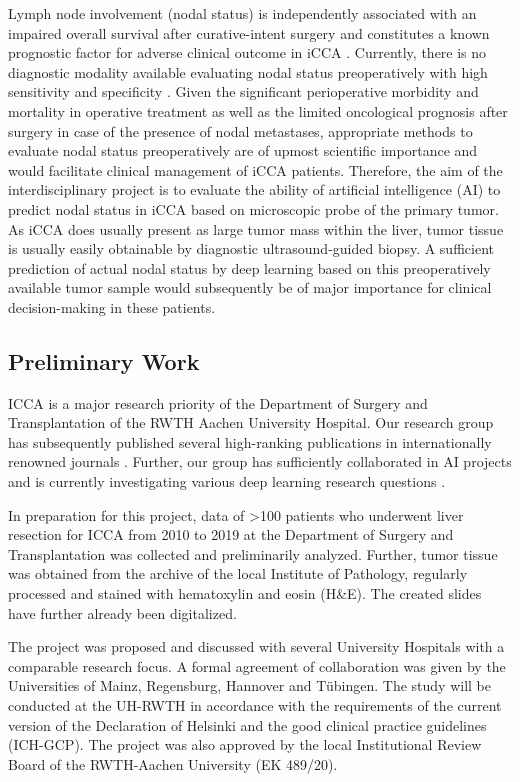 \documentclass[12pt]{article}
\begin{document}
Lymph node involvement (nodal status) is independently associated with an impaired overall survival after curative-intent surgery and constitutes a known prognostic factor for adverse clinical outcome in iCCA \cite{b2, b13}. Currently, there is no diagnostic modality available evaluating nodal status preoperatively with high sensitivity and specificity \cite{b14}. Given the significant perioperative morbidity and mortality in operative treatment as well as the limited oncological prognosis after surgery in case of the presence of nodal metastases, appropriate methods to evaluate nodal status preoperatively are of upmost scientific importance and would facilitate clinical management of iCCA patients. Therefore, the aim of the interdisciplinary project is to evaluate the ability of artificial intelligence (AI) to predict nodal status in iCCA based on microscopic probe of the primary tumor. As iCCA does usually present as large tumor mass within the liver, tumor tissue is usually easily obtainable by diagnostic ultrasound-guided biopsy. A sufficient prediction of actual nodal status by deep learning based on this preoperatively available tumor sample would subsequently be of major importance for clinical decision-making in these patients.

\subsection{Preliminary Work}
ICCA is a major research priority of the Department of Surgery and Transplantation of the RWTH Aachen University Hospital. Our research group has subsequently published several high-ranking publications in internationally renowned journals \cite{b2, b7, b15,b16,b17,b18,b19,b20,b21}. Further, our group has sufficiently collaborated in AI projects and is currently investigating various deep learning research questions
\cite{b22}.

In preparation for this project, data of >100 patients who underwent liver resection for ICCA from 2010 to 2019 at the Department of Surgery and Transplantation was collected and preliminarily analyzed. Further, tumor tissue was obtained from the archive of the local Institute of Pathology, regularly processed and stained with hematoxylin and eosin (H\&E). The created slides have further already been digitalized.

The project was proposed and discussed with several University Hospitals with a comparable research focus. A formal agreement of collaboration was given by the Universities of Mainz, Regensburg, Hannover and Tübingen.
The study will be conducted at the UH-RWTH in accordance with the requirements of the current version of the Declaration of Helsinki and the good clinical practice guidelines (ICH-GCP). The project was also approved by the local Institutional Review Board of the RWTH-Aachen University (EK 489/20).
\end{document}
